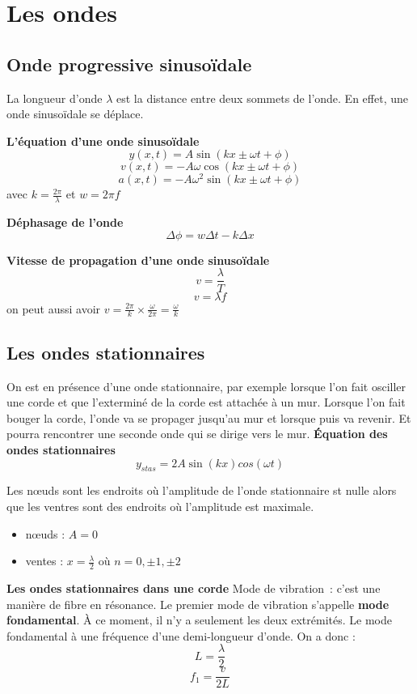 \documentclass{article}
\begin{document}
\section{Les ondes}
\subsection{Onde progressive sinusoïdale}
La longueur d'onde $\lambda$ est la distance entre deux sommets de l'onde. En effet, une onde sinusoïdale se déplace.
\newline

\noindent
\textbf{L'équation d'une onde sinusoïdale}
\[y(x, t) = A\sin{(kx \pm \omega t + \phi)}\]
\[v(x, t) = -A\omega\cos{(kx \pm \omega t + \phi)}\]
\[a(x, t) = -A\omega^2\sin{(kx \pm \omega t + \phi)}\]
avec $k = \frac{2\pi}{\lambda}$ et $w = 2\pi f$
\newline

\noindent
\textbf{Déphasage de l'onde}
\newline
\[\Delta \phi = w\Delta t - k\Delta x\]

\noindent
\textbf{Vitesse de propagation d'une onde sinusoïdale}
\[v = \frac{\lambda}{T}\]
\[v = \lambda f\]
on peut aussi avoir $v = \frac{2\pi}{k}\times\frac{\omega}{2\pi} = \frac{\omega}{k}$

\subsection{Les ondes stationnaires}
On est en présence d'une onde stationnaire, par exemple lorsque l'on fait osciller une corde et que l'exterminé de la corde est attachée à un mur. Lorsque l'on fait bouger la corde, l'onde va se propager jusqu'au mur et lorsque puis va revenir. Et pourra rencontrer une seconde onde qui se dirige vers le mur.
\textbf{Équation des ondes stationnaires}
\[y_{stas} = 2A\sin{(kx)cos(\omega t)}\]
\newline

Les nœuds sont les endroits où l'amplitude de l'onde stationnaire st nulle alors que les ventres sont des endroits où l'amplitude est maximale.
\begin{itemize}
    \item nœuds : $A =0$
    \item ventes : $x = \frac{\lambda}{2}$ où $n = 0, \pm 1, \pm 2$
\end{itemize}
\newline

\noindent
\textbf{Les ondes stationnaires dans une corde}
Mode de vibration : c'est une manière de fibre en résonance.
\newline
Le premier mode de vibration s'appelle \textbf{mode fondamental}. À ce moment, il n'y a seulement les deux extrémités.
\newline
Le mode fondamental à une fréquence d'une demi-longueur d'onde. On a donc :
\[L = \frac{\lambda}{2}\]
\[f_1 = \frac{v}{2L}\]
\end{document}
